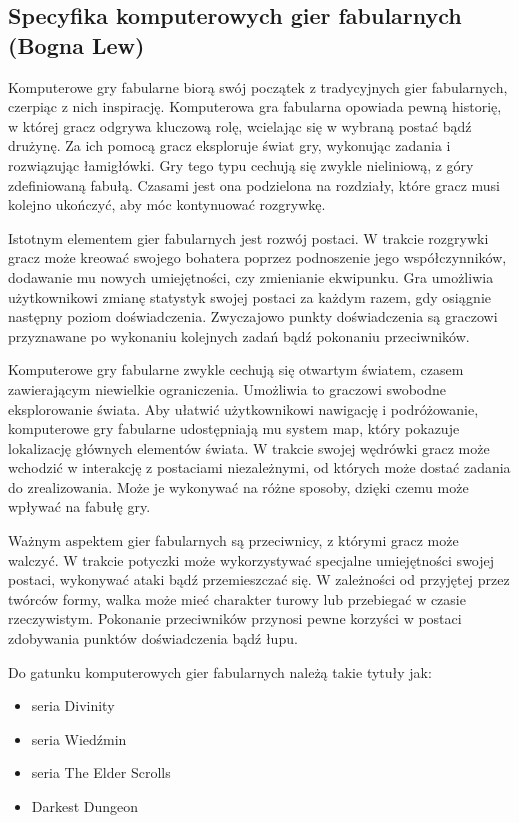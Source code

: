 \subsection{Specyfika komputerowych gier fabularnych (Bogna Lew)}
Komputerowe gry fabularne biorą swój początek z tradycyjnych gier fabularnych, czerpiąc z nich inspirację. Komputerowa
gra fabularna opowiada pewną historię, w której gracz odgrywa kluczową rolę, wcielając się w wybraną postać bądź drużynę.
Za ich pomocą gracz eksploruje świat gry, wykonując zadania i rozwiązując łamigłówki. Gry tego typu cechują się zwykle
nieliniową, z góry zdefiniowaną fabułą. Czasami jest ona podzielona na rozdziały, które gracz musi kolejno ukończyć, aby
móc kontynuować rozgrywkę.

Istotnym elementem gier fabularnych jest rozwój postaci. W trakcie rozgrywki gracz może kreować swojego bohatera
poprzez podnoszenie jego współczynników, dodawanie mu nowych umiejętności, czy zmienianie ekwipunku. Gra umożliwia
użytkownikowi zmianę statystyk swojej postaci za każdym razem, gdy osiągnie następny poziom doświadczenia. Zwyczajowo
punkty doświadczenia są graczowi przyznawane po wykonaniu kolejnych zadań bądź pokonaniu przeciwników.

Komputerowe gry fabularne zwykle cechują się otwartym światem, czasem zawierającym niewielkie ograniczenia. Umożliwia
to graczowi swobodne eksplorowanie świata. Aby ułatwić użytkownikowi nawigację i podróżowanie, komputerowe gry fabularne
udostępniają mu system map, który pokazuje lokalizację głównych elementów świata. W trakcie swojej wędrówki gracz może
wchodzić w interakcję z postaciami niezależnymi, od których może dostać zadania do zrealizowania. Może je wykonywać na
różne sposoby, dzięki czemu może wpływać na fabułę gry.

Ważnym aspektem gier fabularnych są przeciwnicy, z którymi gracz może walczyć. W trakcie potyczki może wykorzystywać
specjalne umiejętności swojej postaci, wykonywać ataki bądź przemieszczać się. W zależności od przyjętej przez twórców
formy, walka może mieć charakter turowy lub przebiegać w czasie rzeczywistym. Pokonanie przeciwników przynosi pewne
korzyści w postaci zdobywania punktów doświadczenia bądź łupu.

Do gatunku komputerowych gier fabularnych należą takie tytuły jak:
\begin{itemize}
  \item seria Divinity
  \item seria Wiedźmin
  \item seria The Elder Scrolls
  \item Darkest Dungeon
\end{itemize}
